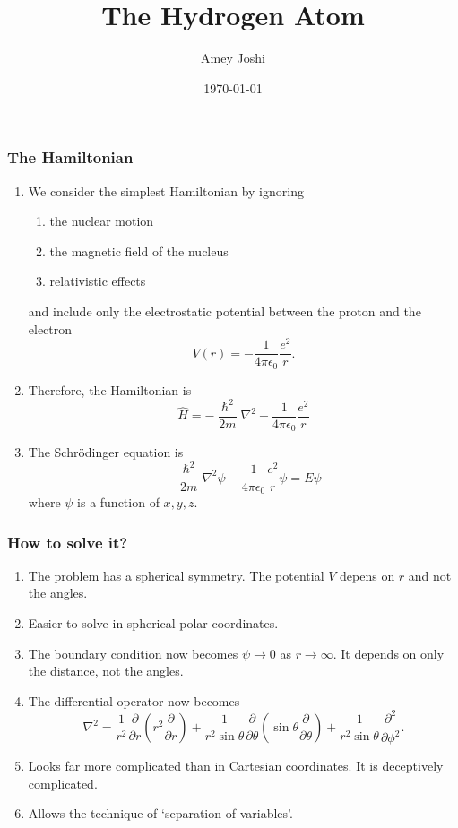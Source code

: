 \documentclass{beamer}
\title{The Hydrogen Atom}
\author{Amey Joshi}
\date{\today}
\begin{document}
\begin{frame}
\titlepage
\end{frame}

\begin{frame}
\frametitle{The Hamiltonian}
\begin{enumerate}
\item We consider the simplest Hamiltonian by ignoring
\begin{enumerate}
\item the nuclear motion
\item the magnetic field of the nucleus
\item relativistic effects
\end{enumerate}
and include only the electrostatic potential between the proton and the 
electron
\begin{equation}\label{e1}
V(r) = -\frac{1}{4\pi\epsilon_0}\frac{e^2}{r}.
\end{equation}
\item Therefore, the Hamiltonian is
\begin{equation}\label{e2}
\hat{H} = -\frac{\hslash^2}{2m}\nabla^2 - 
\frac{1}{4\pi\epsilon_0}\frac{e^2}{r}
\end{equation}
\item The Schr\"{o}dinger equation is
\begin{equation}\label{e3}
-\frac{\hslash^2}{2m}\nabla^2\psi - 
\frac{1}{4\pi\epsilon_0}\frac{e^2}{r}\psi = E\psi
\end{equation}
where $\psi$ is a function of $x, y, z$.
\end{enumerate}
\end{frame}

\begin{frame}
\frametitle{How to solve it?}
\begin{enumerate}
\item The problem has a spherical symmetry. The potential $V$ depens on $r$ and
not the angles.
\item Easier to solve in spherical polar coordinates.
\item The boundary condition now becomes $\psi \rightarrow 0$ as $r \rightarrow 
\infty$. It depends on only the distance, not the angles.
\item The differential operator now becomes
\begin{equation}\label{e4}
\nabla^2 = \frac{1}{r^2}
\frac{\partial}{\partial r}\left(r^2\frac{\partial}{\partial r}\right) +
\frac{1}{r^2\sin\theta}\frac{\partial}{\partial\theta}\left(\sin\theta\frac{
\partial}{\partial\theta}\right) + \frac{1}{r^2\sin\theta}\frac{\partial^2}
{\partial\phi^2}.
\end{equation}
\item Looks far more complicated than in Cartesian coordinates. It is 
deceptively complicated.
\item Allows the technique of `separation of variables'.
\end{enumerate}
\end{frame}
\end{document}
